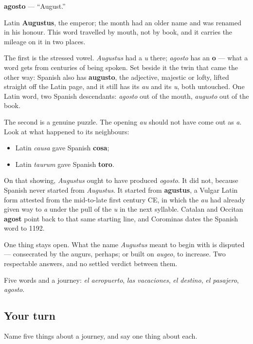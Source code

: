 \begin{cousinweb}
\textbf{agosto} — \textquotedblleft{}August.\textquotedblright{}

Latin \textbf{Augustus}, the emperor; the month had an older name and was renamed in his honour. This word travelled by mouth, not by book, and it carries the mileage on it in two places.

The first is the stressed vowel. \emph{Augustus} had a \emph{u} there; \emph{agosto} has an \textbf{o} — what a word gets from centuries of being spoken. Set beside it the twin that came the other way: Spanish also has \textbf{augusto}, the adjective, majestic or lofty, lifted straight off the Latin page, and it still has its \emph{au} and its \emph{u}, both untouched. One Latin word, two Spanish descendants: \emph{agosto} out of the mouth, \emph{augusto} out of the book.

The second is a genuine puzzle. The opening \emph{au} should not have come out as \emph{a}. Look at what happened to its neighbours:

\begin{itemize}
\raggedright
  \item Latin \emph{causa} gave Spanish \textbf{cosa};
  \item Latin \emph{taurum} gave Spanish \textbf{toro}.
\end{itemize}

On that showing, \emph{Augustus} ought to have produced \emph{ogosto}. It did not, because Spanish never started from \emph{Augustus}. It started from \textbf{agustus}, a Vulgar Latin form attested from the mid-to-late first century CE, in which the \emph{au} had already given way to \emph{a} under the pull of the \emph{u} in the next syllable. Catalan and Occitan \textbf{agost} point back to that same starting line, and Corominas dates the Spanish word to 1192.

One thing stays open. What the name \emph{Augustus} meant to begin with is disputed — consecrated by the augurs, perhaps; or built on \emph{augeo}, to increase. Two respectable answers, and no settled verdict between them.
\end{cousinweb}

\begin{grammarlens}[title={What you've built}]
Five words and a journey: \emph{el aeropuerto}, \emph{las vacaciones}, \emph{el destino}, \emph{el pasajero}, \emph{agosto}.
\end{grammarlens}

\subsection*{Your turn}
Name five things about a journey, and say one thing about each.

